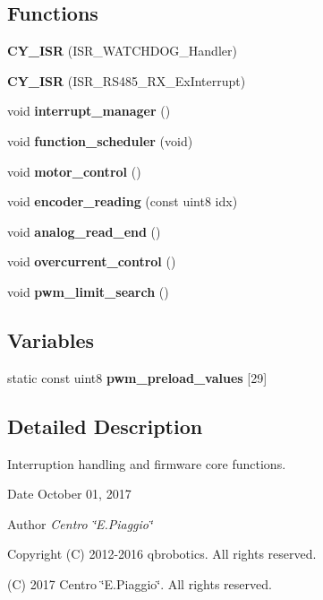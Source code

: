 \subsection*{Functions}
\begin{DoxyCompactItemize}
\item 
\mbox{\label{interruptions_8c_aba74df0c62c62434ebccf8124c5d5fef}} 
{\bfseries C\+Y\+\_\+\+I\+SR} (I\+S\+R\+\_\+\+W\+A\+T\+C\+H\+D\+O\+G\+\_\+\+Handler)
\item 
\mbox{\label{interruptions_8c_a7692d8c3185943c5bdfaa6de0a172ad3}} 
{\bfseries C\+Y\+\_\+\+I\+SR} (I\+S\+R\+\_\+\+R\+S485\+\_\+\+R\+X\+\_\+\+Ex\+Interrupt)
\item 
void \textbf{ interrupt\+\_\+manager} ()
\item 
void \textbf{ function\+\_\+scheduler} (void)
\item 
void \textbf{ motor\+\_\+control} ()
\item 
void \textbf{ encoder\+\_\+reading} (const uint8 idx)
\item 
void \textbf{ analog\+\_\+read\+\_\+end} ()
\item 
void \textbf{ overcurrent\+\_\+control} ()
\item 
void \textbf{ pwm\+\_\+limit\+\_\+search} ()
\end{DoxyCompactItemize}
\subsection*{Variables}
\begin{DoxyCompactItemize}
\item 
static const uint8 {\bfseries pwm\+\_\+preload\+\_\+values} [29]
\end{DoxyCompactItemize}


\subsection{Detailed Description}
Interruption handling and firmware core functions. 

\begin{DoxyDate}{Date}
October 01, 2017 
\end{DoxyDate}
\begin{DoxyAuthor}{Author}
{\itshape Centro \char`\"{}\+E.\+Piaggio\char`\"{}} 
\end{DoxyAuthor}
\begin{DoxyCopyright}{Copyright}
(C) 2012-\/2016 qbrobotics. All rights reserved. 

(C) 2017 Centro \char`\"{}\+E.\+Piaggio\char`\"{}. All rights reserved. 
\end{DoxyCopyright}


